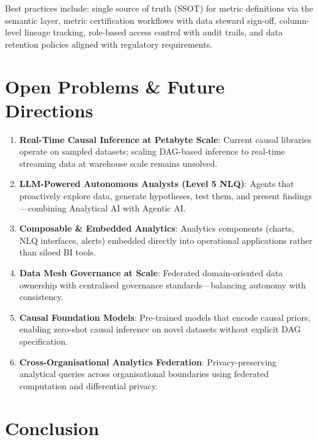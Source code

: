 \documentclass[12pt, a4paper]{article}
\begin{document}
Best practices include: single source of truth (SSOT) for metric definitions via the semantic layer, metric certification workflows with data steward sign-off, column-level lineage tracking, role-based access control with audit trails, and data retention policies aligned with regulatory requirements.

\section{Open Problems \& Future Directions}\label{sec:future}

\begin{enumerate}
    \item \textbf{Real-Time Causal Inference at Petabyte Scale}: Current causal libraries operate on sampled datasets; scaling DAG-based inference to real-time streaming data at warehouse scale remains unsolved.
    \item \textbf{LLM-Powered Autonomous Analysts (Level 5 NLQ)}: Agents that proactively explore data, generate hypotheses, test them, and present findings---combining Analytical AI with Agentic AI.
    \item \textbf{Composable \& Embedded Analytics}: Analytics components (charts, NLQ interfaces, alerts) embedded directly into operational applications rather than siloed BI tools.
    \item \textbf{Data Mesh Governance at Scale}: Federated domain-oriented data ownership with centralised governance standards---balancing autonomy with consistency.
    \item \textbf{Causal Foundation Models}: Pre-trained models that encode causal priors, enabling zero-shot causal inference on novel datasets without explicit DAG specification.
    \item \textbf{Cross-Organisational Analytics Federation}: Privacy-preserving analytical queries across organisational boundaries using federated computation and differential privacy.
\end{enumerate}

\section{Conclusion}\label{sec:conclusion}
\end{document}
